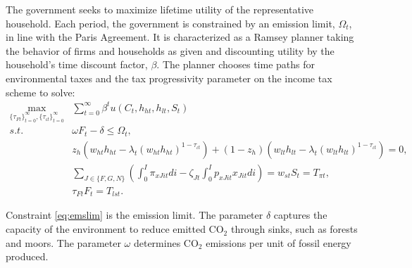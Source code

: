The government seeks to maximize lifetime utility of the representative household. Each period, the government is constrained by an emission limit, $\Omega_t$, in line with the Paris Agreement.  
It is characterized as a Ramsey planner taking the behavior of firms and households as given and discounting utility by the household's time discount factor, $\beta$.
The planner chooses time paths for environmental taxes and the tax progressivity parameter on the income tax scheme to solve:%
\begin{align}
\underset{\{\tau_{Ft}\}_{t=0}^{\infty},\{\tau_{\iota t}\}_{t=0}^{\infty}}{\max}&\sum_{t=0}^{\infty}\beta^t u(C_{t}, h_{ht}, h_{lt}, S_t)%
\nonumber \\
s.t.\ %
&  \omega F_{t} -\delta \leq \Omega_t, \label{eq:emslim} %
\\ %
&  z_h\left(w_{ht}h_{ht}-\lambda_t \left(w_{ht}h_{ht}\right)^{1-\tau_{\iota t}}\right)+(1-z_h)\left(w_{lt}h_{lt}-\lambda_t\left(w_{lt}h_{lt}\right)^{1-\tau_{\iota t}}\right)=0, \label{eq:incbud}\\
&  \sum_{J\in\{F,G,N\}}\left(\int_{0}^{I}\pi_{xJit}di-\zeta_{Jt}\int_{0}^{I}p_{xJit}x_{Jit}di\right) = w_{st}S_t= T_{\pi t},\label{eq:profbud}\\ 
&  \tau_{Ft}F_{t}=T_{lst}.\label{eq:envbud}
\end{align}

Constraint \eqref{eq:emslim} is the emission limit. The parameter $\delta$ captures the capacity of the environment to reduce emitted CO$_2$ through sinks, such as forests and moors.  The parameter $\omega$ determines  CO$_2$ emissions per unit of fossil energy produced. %

